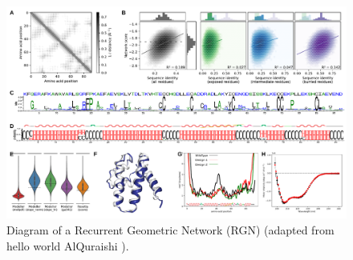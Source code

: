 
\begin{figure}[tb]
    \centering
    \includegraphics[width=1.0\linewidth]{figures/generated/design-1n5u.pdf}
    \caption[Recurrent Geometric Network.]{Diagram of a Recurrent Geometric Network (RGN) (adapted from hello world AlQuraishi \cite{AlQuraishiEndtoenddifferentiablelearning2018}). }
    \label{fig:rgn}
\end{figure}
